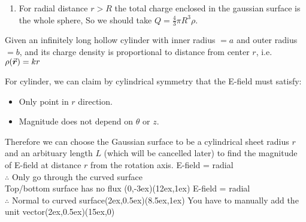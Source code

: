 \documentclass[class=article, crop=false, 12pt]{standalone}
\begin{document}
\begin{example}
\begin{enumerate}

        \item For radial distance $r > R$
        the total charge enclosed in the gaussian surface is the whole sphere,
        So we should take $Q=\frac{4}{3}\pi R^3\rho$.

    \end{enumerate}
    
    
\end{example}



\begin{example}
    Given an infinitely long hollow cylinder with inner radius $=a$ and outer radius $=b$,
    and its charge density is proportional to distance from center $r$, i.e. $\rho(\va*{r}) =kr$
    
    For cylinder, we can claim by cylindrical symmetry 
    that the E-field must satisfy:
    \begin{itemize}
        \item Only point in $r$ direction.
        \item Magnitude does not depend on $\theta$ or $z$.
    \end{itemize}


    Therefore we can choose the Gaussian surface to be a cylindrical sheet radius $r$ 
    and an arbituary length $L$ (which will be cancelled later)
    to find the magnitude of E-field at distance $r$ from the rotation axis.
    {\scriptsize E-field = radial \\[-1ex]\scriptsize $\therefore$ Only go through the curved surface \\[-1ex]\scriptsize Top/bottom surface has no flux}
    {(0,-3ex)}{(12ex,1ex)}
    {\scriptsize E-field = radial \\[-1ex]\scriptsize $\therefore$ Normal to curved surface}{(2ex,0.5ex)}{(8.5ex,1ex)}
    {\scriptsize You have to manually add the unit vector}{(2ex,0.5ex)}{(15ex,0)}


\end{example}
\end{document}
